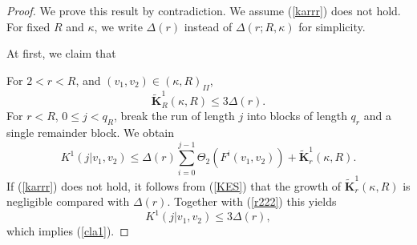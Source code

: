 \documentclass{amsart}
\theoremstyle{definition}
\begin{document}
\begin{proof}
We prove this result by contradiction. We assume (\ref{karrr}) does not hold.  For fixed $R$ and $\kappa$, we write $\Delta(r)$ instead of $\Delta(r;R,\kappa)$ for simplicity.

At first, we claim that

For $2< r<R$, and $(v_1,v_2)\in (\kappa,R)_{II}$,
\begin{equation}\label{cla1}
\widetilde{\mathbf{K}}_R^1(\kappa,R)\leq 3\Delta(r).
\end{equation}
For $r<R$, $0\leq j<q_R$, break the run of length $j$ into blocks of length $q_r$ and a single remainder block. We obtain
\begin{equation}\label{wan}
{K^1(j|v_1,v_2)\leq \Delta(r)\sum_{i=0}^{j-1}\Theta_2(F^i(v_1,v_2))+\widetilde{\mathbf{K}}_r^1(\kappa,R).}
\end{equation}
If (\ref{karrr}) does not hold, it follows from (\ref{KES}) that the growth of \(\widetilde{\mathbf{K}}_r^1(\kappa,R)\) is negligible compared with \(\Delta(r)\). Together with (\ref{r222}) this yields
\[K^1(j|v_1,v_2)\leq 3\Delta(r),\]
which implies (\ref{cla1}).






\end{proof}
\end{document}
